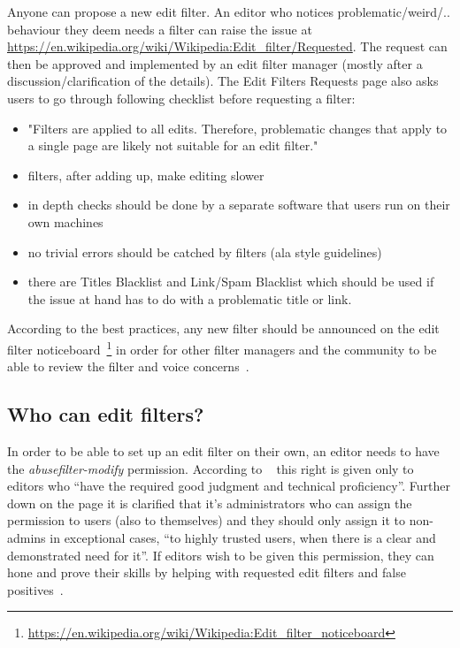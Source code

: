 \documentclass{sigchi}
\begin{document}
Anyone can propose a new edit filter.
An editor who notices problematic/weird/.. behaviour they deem needs a filter can raise the issue at \url{https://en.wikipedia.org/wiki/Wikipedia:Edit_filter/Requested}.
The request can then be approved and implemented by an edit filter manager (mostly after a discussion/clarification of the details).
The Edit Filters Requests page also asks users to go through following checklist before requesting a filter:
\begin{itemize}
    \item "Filters are applied to all edits. Therefore, problematic changes that apply to a single page are likely not suitable for an edit filter."
    \item filters, after adding up, make editing slower
    \item in depth checks should be done by a separate software that users run on their own machines
    \item no trivial errors should be catched by filters (ala style guidelines)
    \item there are Titles Blacklist and Link/Spam Blacklist which should be used if the issue at hand has to do with a problematic title or link.
\end{itemize}

According to the best practices, any new filter should be announced on the edit filter noticeboard~\footnote{\url{https://en.wikipedia.org/wiki/Wikipedia:Edit_filter_noticeboard}} in order for other filter managers and the community to be able to review the filter and voice concerns~\cite{Wikipedia:EditFilter}.

\subsection{Who can edit filters?}

In order to be able to set up an edit filter on their own, an editor needs to have the \emph{abusefilter-modify} permission.
According to ~\cite{Wikipedia:EditFilter} this right is given only to editors who ``have the required good judgment and technical proficiency''.
Further down on the page it is clarified that it's administrators who can assign the permission to users (also to themselves) and they should only assign it to non-admins in exceptional cases, ``to highly trusted users, when there is a clear and demonstrated need for it''.
If editors wish to be given this permission, they can hone and prove their skills by helping with requested edit filters and false positives~\cite{Wikipedia:EditFilter}.
\end{document}
